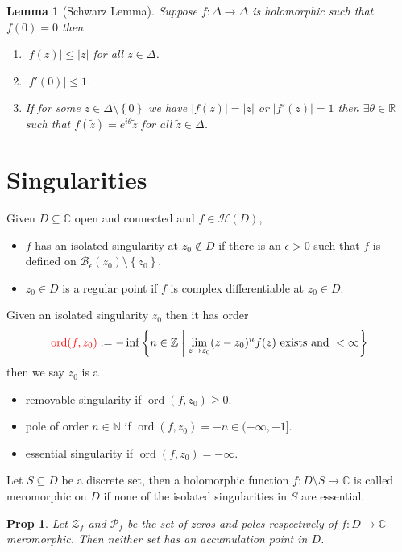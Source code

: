 \documentclass[11pt]{article}
\newcommand{\defeq}{:=}
\newcommand{\abs}[1]{|#1|}
\DeclareMathOperator{\ord}{\text{ord}}
\newcommand{\relmiddle}[1]{\mathrel{}\middle#1\mathrel{}}
\newcommand{\rmv}{\relmiddle|}
\newcommand{\R}{\mathbb{R}}
\newcommand{\C}{\mathbb{C}}
\newcommand{\Z}{\mathbb{Z}}
\newcommand{\N}{\mathbb{N}}
\newenvironment{defin}
	{\begin{mdframed}[backgroundcolor=white, roundcorner=5pt, linewidth=1pt]}
	{\end{mdframed}}
\newcommand{\mdf}[1]{{\color{red} #1}}
\newtheorem{prop}[theorem]{Prop}
\newtheorem{lemma}[theorem]{Lemma}
\begin{document}
\begin{lemma}[Schwarz Lemma]
Suppose $f:\Delta\to\Delta$ is holomorphic such that $f(0)=0$ then
\begin{enumerate}[label=(\roman*)]
	\item $\abs{f(z)}\leq\abs{z}$ for all $z\in\Delta$.
	\item $\abs{f'(0)}\leq 1$.
	\item If for some $z\in\Delta\setminus\left\{0\right\}$ we have $\abs{f(z)}=\abs{z}$ or $\abs{f'(z)}=1$ then $\exists\theta\in\R$ such that $f(\widetilde{z})=e^{i\theta}\widetilde{z}$ for all $\widetilde{z}\in\Delta$.
\end{enumerate}
\end{lemma}

\section{Singularities}

\begin{defin}
	Given $D\subseteq \C$ open and connected and $f\in\mathcal{H}(D)$,
	\begin{itemize}
		\item $f$ has an \mdf{isolated singularity} at $z_0\not\in D$ if there is an $\epsilon >0$ such that $f$ is defined on $\mathcal{B}_\epsilon(z_0)\setminus\left\{z_0\right\}$.
		\item $z_0\in D$ is a \mdf{regular point} if $f$ is complex differentiable at $z_0\in D$.
	\end{itemize}
	Given an isolated singularity $z_0$ then it has \mdf{order}
	\[
		\mdf{\ord(f,z_0)}\defeq-\inf\left\{n\in\Z \rmv \lim_{z\to z_0} (z-z_0)^n f(z) \text{ exists and }<\infty\right\}
	\]
	then we say $z_0$ is a
	\begin{itemize}
		\item \mdf{removable singularity} if $\ord(f,z_0)\geq 0$.
		\item \mdf{pole of order $n\in\N$} if $\ord(f, z_0)=-n\in(-\infty, -1]$.
		\item \mdf{essential singularity} if $\ord(f, z_0)=-\infty$.
	\end{itemize}
	Let $S\subseteq D$ be a discrete set, then a holomorphic function $f:D\setminus S\to\C$ is called \mdf{meromorphic on $D$} if none of the isolated singularities in $S$ are essential.
\end{defin}

\begin{prop}
Let $\mathcal{Z}_f$ and $\mathcal{P}_f$ be the set of zeros and poles respectively of $f:D\to\C$ meromorphic.
Then neither set has an accumulation point in $D$.
\end{prop}
\end{document}
